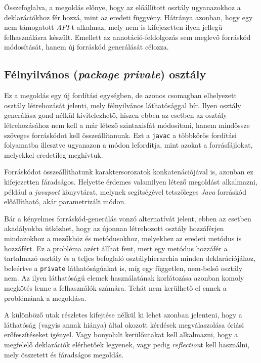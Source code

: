 Összefoglalva, a megoldás előnye, hogy az előállított osztály ugyanazokhoz a deklarációkhoz fér hozzá, mint az eredeti függvény. Hátránya azonban, hogy egy nem támogatott \textit{API}-t alkalmaz, mely nem is kifejezetten ilyen jellegű felhasználásra készült. Emellett az annotáció-feldolgozás sem meglevő forráskód módosítását, hanem új forráskód generálását célozza.

\subsection{Félnyilvános (\textit{package private}) osztály}

Ez a megoldás egy új fordítási egységben, de azonos csomagban elhelyezett osztály létrehozását jelenti, mely félnyilvános láthatósággal bír. Ilyen osztály generálása gond nélkül kivitelezhető, hiszen ebben az esetben az osztály létrehozásához nem kell a már létező szintaxisfát módosítani, hanem mindössze szöveges forráskódot kell összeállítanunk. Ezt a \texttt{javac} a többkörös fordítási folyamatba illesztve ugyanazon a módon lefordítja, mint azokat a forrásfájlokat, melyekkel eredetileg meghívtuk.

Forráskódot összeállíthatunk karaktersorozatok konkatenációjával is, azonban ez kifejezetten fáradságos. Helyette érdemes valamilyen létező megoldást alkalmazni, például a \textit{javapoet} könyvtárat, melynek segítségével tetszőleges \textit{Java} forráskód előállítható, akár parametrizált módon.

Bár a kényelmes forráskód-generálás vonzó alternatívát jelent, ebben az esetben akadályokba ütközhet, hogy az újonnan létrehozott osztály hozzáférjen mindazokhoz a mezőkhöz és metódusokhoz, melyekhez az eredeti metódus is hozzáfért. Ez a probléma azért állhat fent, mert egy metódus hozzáfér a tartalmazó osztály és a teljes befoglaló osztályhierarchia minden deklarációjához, beleértve a \texttt{private} láthatóságúakat is, míg egy független, nem-belső osztály nem. Az ilyen láthatóságú elemek használatának korlátozása azonban komoly megkötés lenne a felhasználók számára. Tehát nem kerülhető el ennek a problémának a megoldása.

A különböző utak részletes kifejtése nélkül ki lehet azonban jelenteni, hogy a láthatóság (vagyis annak hiánya) által okozott kérdések megválaszolása óriási erőfeszítéseket igényel. Vagy bonyolult kerülőutakat kell alkalmazni, hogy a megfelelő deklarációk elérhetőek legyenek, vagy pedig \textit{reflection}t kell használni, mely összetett és fáradságos megoldás.

